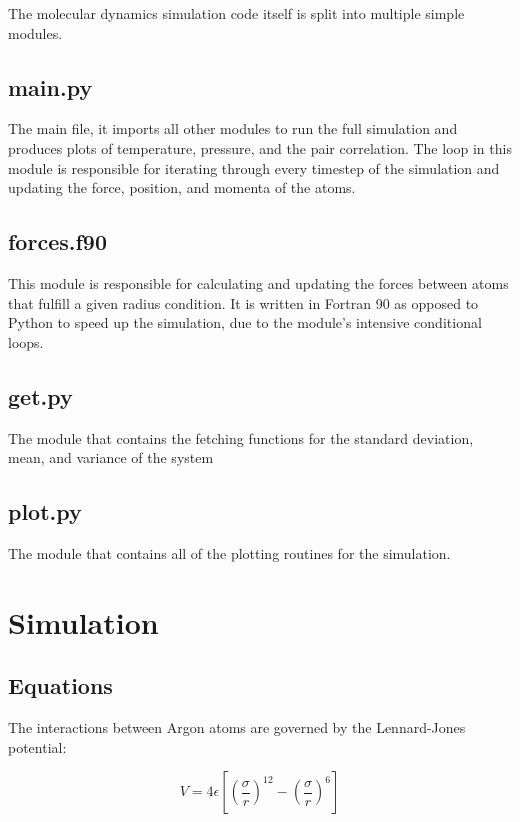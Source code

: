 \documentclass[10pt,letterpaper]{article}
\begin{document}
The molecular dynamics simulation code itself is split into multiple simple modules.

\subsection{main.py}

The main file, it imports all other modules to run the full simulation and produces plots of temperature, pressure, and the pair correlation. The loop in this module is responsible for iterating through every timestep of the simulation and updating the force, position, and momenta of the atoms.

\subsection{forces.f90}

This module is responsible for calculating and updating the forces between atoms that fulfill a given radius condition. It is written in Fortran 90 as opposed to Python to speed up the simulation, due to the module's intensive conditional loops.

\subsection{get.py}

The module that contains the fetching functions for the standard deviation, mean, and variance of the system

\subsection{plot.py}

The module that contains all of the plotting routines for the simulation.

\section{Simulation}

\subsection{Equations}

The interactions between Argon atoms are governed by the Lennard-Jones potential:

\begin{equation}
V = 4{\epsilon}[(\frac{\sigma}{r})^{12} - (\frac{\sigma}{r})^6]
\end{equation}
\end{document}
